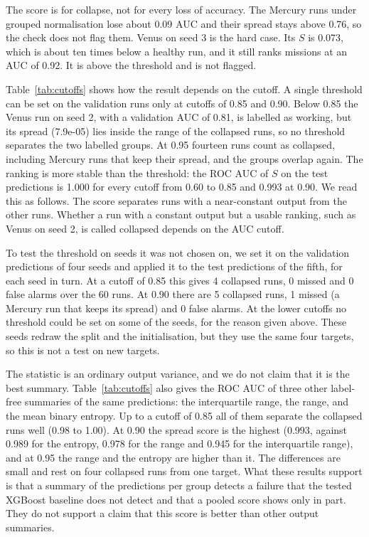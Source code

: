 \documentclass[preprint,12pt,authoryear,doubleblind]{elsarticle}
\begin{document}
The score is for collapse, not for every loss of accuracy. The Mercury runs under grouped normalisation lose about 0.09 AUC and their spread stays above 0.76, so the check does not flag them. Venus on seed 3 is the hard case. Its $S$ is 0.073, which is about ten times below a healthy run, and it still ranks missions at an AUC of 0.92. It is above the threshold and is not flagged.

Table~\ref{tab:cutoffs} shows how the result depends on the cutoff. A single threshold can be set on the validation runs only at cutoffs of 0.85 and 0.90. Below 0.85 the Venus run on seed 2, with a validation AUC of 0.81, is labelled as working, but its spread (7.9e-05) lies inside the range of the collapsed runs, so no threshold separates the two labelled groups. At 0.95 fourteen runs count as collapsed, including Mercury runs that keep their spread, and the groups overlap again. The ranking is more stable than the threshold: the ROC AUC of $S$ on the test predictions is 1.000 for every cutoff from 0.60 to 0.85 and 0.993 at 0.90. We read this as follows. The score separates runs with a near-constant output from the other runs. Whether a run with a constant output but a usable ranking, such as Venus on seed 2, is called collapsed depends on the AUC cutoff.

To test the threshold on seeds it was not chosen on, we set it on the validation predictions of four seeds and applied it to the test predictions of the fifth, for each seed in turn. At a cutoff of 0.85 this gives 4 collapsed runs, 0 missed and 0 false alarms over the 60 runs. At 0.90 there are 5 collapsed runs, 1 missed (a Mercury run that keeps its spread) and 0 false alarms. At the lower cutoffs no threshold could be set on some of the seeds, for the reason given above. These seeds redraw the split and the initialisation, but they use the same four targets, so this is not a test on new targets.

The statistic is an ordinary output variance, and we do not claim that it is the best summary. Table~\ref{tab:cutoffs} also gives the ROC AUC of three other label-free summaries of the same predictions: the interquartile range, the range, and the mean binary entropy. Up to a cutoff of 0.85 all of them separate the collapsed runs well (0.98 to 1.00). At 0.90 the spread score is the highest (0.993, against 0.989 for the entropy, 0.978 for the range and 0.945 for the interquartile range), and at 0.95 the range and the entropy are higher than it. The differences are small and rest on four collapsed runs from one target. What these results support is that a summary of the predictions per group detects a failure that the tested XGBoost baseline does not detect and that a pooled score shows only in part. They do not support a claim that this score is better than other output summaries.
\end{document}

